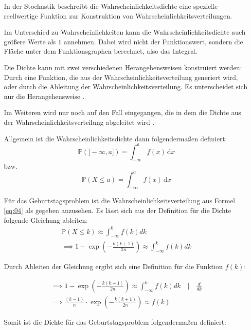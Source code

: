 \documentclass[../main.tex]{subfiles}
\begin{document}
\begin{flushleft}
In der Stochastik beschreibt die Wahrscheinlichkeitsdichte eine spezielle reellwertige Funktion zur Konstruktion von Wahrscheinlichkeitsverteilungen.

Im Unterschied zu Wahrscheinlichkeiten kann die Wahrscheinlichkeitsdichte auch größere Werte als $1$ annehmen. Dabei wird nicht der Funktionswert, sondern die Fläche unter dem Funktionsgraphen berechnet, also das Integral.

Die Dichte kann mit zwei verschiedenen Herangehensweisen konstruiert werden: Durch eine Funktion, die aus der Wahrscheinlichkeitsverteilung generiert wird, oder durch die Ableitung der Wahrscheinlichkeitsverteilung. Es unterscheidet sich nur die Herangehensweise  \cite[560ff]{henze}. 

Im Weiteren wird nur noch auf den Fall eingegangen, die in dem die Dichte aus der Wahrscheinlichkeitsverteilung abgeleitet wird  \cite[22ff]{georgii}. \newline

Allgemein ist die Wahrscheinlichkeitsdichte dann folgendermaßen definiert:
\begin{equation}
\mathbb{P}(]-\infty, a])= \int_{-\infty}^a f(x) \, \mathrm d x
\end{equation}
bzw.
\begin{equation}
\mathbb{P}(X \leq a)= \int_{-\infty}^a f(x) \,\mathrm d x
\end{equation}

Für das Geburtstagsproblem ist die Wahrscheinlichkeitsverteilung aus Formel \ref{eq:04} als gegeben anzusehen. Es lässt sich aus der Definition für die Dichte folgende Gleichung ableiten:
\begin{eqnarray}
\mathbb{P}(X \leq k) \approx \int_{ -\infty }^{ k }{ f(k) dk } \\
\implies 1 - \exp( - \frac{ k (k + 1) }{ 2n } ) \approx \int_{ -\infty }^{ k }{ f(k) dk }
\end{eqnarray}

Durch Ableiten der Gleichung ergibt sich eine Definition für die Funktion $f(k)$:

\begin{eqnarray}
\implies 1 - \exp( - \frac{ k (k + 1) }{ 2n } ) \approx \int_{ -\infty }^{ k }{ f(k) dk } \quad | \quad \frac{ d }{ dk }\\
\implies \frac{ (k-1) }{ n } \cdot \exp( - \frac{ k (k + 1) }{ 2n } ) \approx f(k)
\end{eqnarray}

Somit ist die Dichte für das Geburtstagsproblem folgendermaßen definiert:


\end{flushleft}
\end{document}
